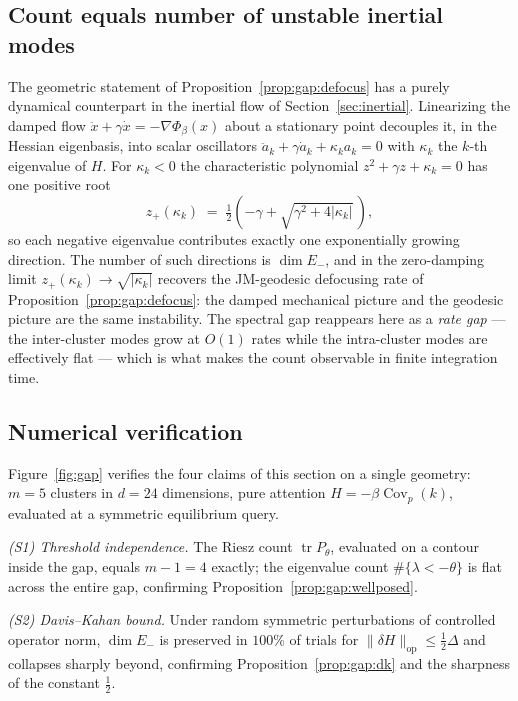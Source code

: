 \subsection{Count equals number of unstable inertial modes}
\label{sec:gap:inertial}

The geometric statement of Proposition~\ref{prop:gap:defocus} has a purely
dynamical counterpart in the inertial flow of Section~\ref{sec:inertial}. Linearizing the
damped flow $\ddot x + \gamma\dot x = -\nabla\Phi_\beta(x)$ about a stationary
point decouples it, in the Hessian eigenbasis, into scalar oscillators
$\ddot a_k + \gamma\dot a_k + \kappa_k a_k = 0$ with $\kappa_k$ the $k$-th
eigenvalue of $H$. For $\kappa_k<0$ the characteristic polynomial
$z^2+\gamma z+\kappa_k=0$ has one positive root
\begin{equation}
  z_+(\kappa_k)
   \;=\; \tfrac12\!\left(-\gamma + \sqrt{\gamma^2 + 4|\kappa_k|}\,\right),
  \label{eq:gap:zplus}
\end{equation}
so each negative eigenvalue contributes exactly one exponentially growing
direction. The number of such directions is $\dim E_-$, and in the
zero-damping limit $z_+(\kappa_k)\to\sqrt{|\kappa_k|}$ recovers the
JM-geodesic defocusing rate of Proposition~\ref{prop:gap:defocus}: the damped
mechanical picture and the geodesic picture are the same instability. The
spectral gap reappears here as a \emph{rate gap} --- the inter-cluster modes
grow at $O(1)$ rates while the intra-cluster modes are effectively flat ---
which is what makes the count observable in finite integration time.

\subsection{Numerical verification}
\label{sec:gap:numerics}

Figure~\ref{fig:gap} verifies the four claims of this section on a single
geometry: $m=5$ clusters in $d=24$ dimensions, pure attention
$H=-\beta\operatorname{Cov}_p(k)$, evaluated at a symmetric equilibrium query.

\emph{(S1) Threshold independence.} The Riesz count
$\operatorname{tr}P_\theta$, evaluated on a contour inside the gap, equals
$m-1=4$ exactly; the eigenvalue count $\#\{\lambda<-\theta\}$ is flat across
the entire gap, confirming Proposition~\ref{prop:gap:wellposed}.

\emph{(S2) Davis--Kahan bound.} Under random symmetric perturbations of
controlled operator norm, $\dim E_-$ is preserved in $100\%$ of trials for
$\|\delta H\|_{\mathrm{op}}\le\tfrac12\Delta$ and collapses sharply beyond,
confirming Proposition~\ref{prop:gap:dk} and the sharpness of the constant
$\tfrac12$.

